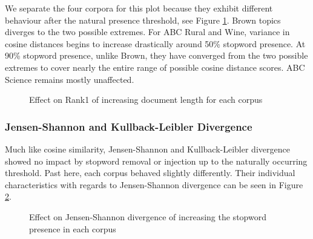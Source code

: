 \documentclass[letterpaper, 10 pt, conference]{ieeeconf}  %
\begin{document}
We separate the four corpora for this plot because they exhibit different behaviour after the natural presence threshold, see Figure \ref{fig:sw_cos_8_8}. Brown topics diverges to the two possible extremes. For ABC Rural and Wine, variance in cosine distances begins to increase drastically around 50\% stopword presence. At 90\% stopword presence, unlike Brown, they have converged from the two possible extremes to cover nearly the entire range of possible cosine distance scores. ABC Science remains mostly unaffected. 

\begin{figure}[thpb]
      \centering
      \caption{Effect on Rank1 of increasing document length for each corpus}
      \label{fig:sw_cos_8_8}
   \end{figure}

\subsubsection{Jensen-Shannon and Kullback-Leibler Divergence}
Much like cosine similarity, Jensen-Shannon and Kullback-Leibler divergence showed no impact by stopword removal or injection up to the naturally occurring threshold. Past here, each corpus behaved slightly differently. Their individual characteristics with regards to Jensen-Shannon divergence can be seen in Figure \ref{fig:sw_jsd_4_8}.

\begin{figure}[thpb]
      \centering
      \caption{Effect on Jensen-Shannon divergence of increasing the stopword presence in each corpus}
      \label{fig:sw_jsd_4_8}
   \end{figure}
\end{document}
